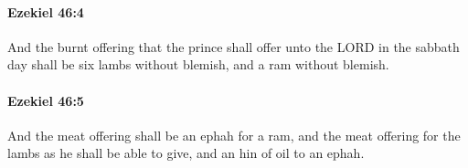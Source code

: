 		\paragraph{Ezekiel 46:4} %
			\label{EZEKIEL-46-4}

			And the burnt offering that the prince shall offer unto the LORD in the sabbath day shall be six lambs without blemish, and a ram without blemish.


		\paragraph{Ezekiel 46:5} %
			\label{EZEKIEL-46-5}

			And the meat offering shall be an ephah for a ram, and the meat offering for the lambs as he shall be able to give, and an hin of oil to an ephah.


